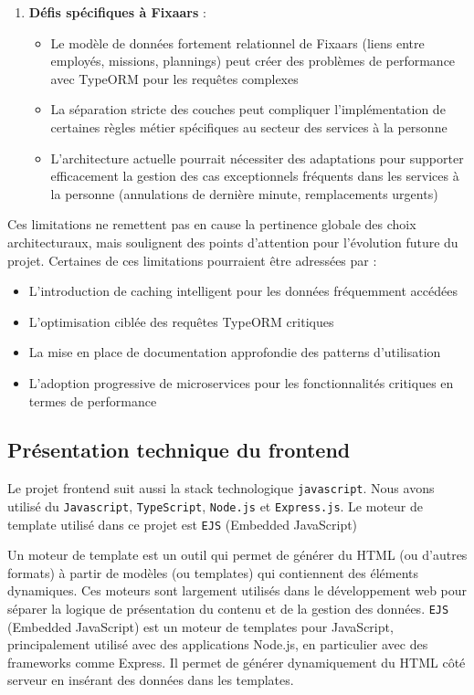 {\begin{enumerate}
    \item \textbf{Défis spécifiques à Fixaars} :
    \begin{itemize}
        \item Le modèle de données fortement relationnel de Fixaars (liens entre employés, missions, plannings) peut créer des problèmes de performance avec TypeORM pour les requêtes complexes
        \item La séparation stricte des couches peut compliquer l'implémentation de certaines règles métier spécifiques au secteur des services à la personne
        \item L'architecture actuelle pourrait nécessiter des adaptations pour supporter efficacement la gestion des cas exceptionnels fréquents dans les services à la personne (annulations de dernière minute, remplacements urgents)
    \end{itemize}
\end{enumerate}

Ces limitations ne remettent pas en cause la pertinence globale des choix architecturaux, mais soulignent des points d'attention pour l'évolution future du projet. Certaines de ces limitations pourraient être adressées par :
\begin{itemize}
    \item L'introduction de caching intelligent pour les données fréquemment accédées
    \item L'optimisation ciblée des requêtes TypeORM critiques
    \item La mise en place de documentation approfondie des patterns d'utilisation
    \item L'adoption progressive de microservices pour les fonctionnalités critiques en termes de performance
\end{itemize}

\subsection*{Présentation technique du frontend}
Le projet frontend suit aussi la stack technologique \verb|javascript|. Nous avons utilisé du \verb|Javascript|, \verb|TypeScript|, \verb|Node.js| et \verb|Express.js|. Le moteur de template utilisé dans ce projet est \verb|EJS| (Embedded JavaScript)

\vspace{0.35cm}

Un moteur de template est un outil qui permet de générer du HTML (ou d'autres formats) à partir de modèles (ou templates) qui contiennent des éléments dynamiques. Ces moteurs sont largement utilisés dans le développement web pour séparer la logique de présentation du contenu et de la gestion des données. \verb|EJS| (Embedded JavaScript) est un moteur de templates pour JavaScript, principalement utilisé avec des applications Node.js, en particulier avec des frameworks comme Express. Il permet de générer dynamiquement du HTML côté serveur en insérant des données dans les templates.

}
